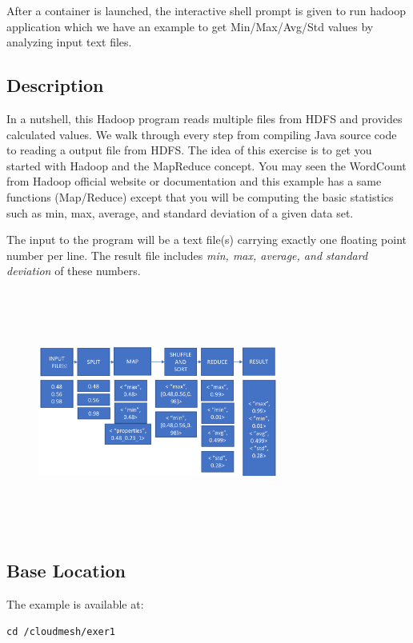 After a container is launched, the interactive shell prompt is given
to run hadoop application which we have an example to get
Min/Max/Avg/Std values by analyzing input text files.

\subsection{Description}

In a nutshell, this Hadoop program reads multiple files from HDFS and
provides calculated values. We walk through every step from compiling
Java source code to reading a output file from HDFS\@. The idea of this
exercise is to get you started with Hadoop and the MapReduce
concept. You may seen the WordCount from Hadoop official website or
documentation and this example has a same functions (Map/Reduce)
except that you will be computing the basic statistics such as min,
max, average, and standard deviation of a given data set.

The input to the program will be a text file(s) carrying exactly one
floating point number per line. The result file includes \textit{min,
  max, average, and standard deviation} of these numbers.


  \begin{figure}[!htbp]
    \includegraphics[width=8cm,height=8cm]{section/container/images/docker-hadoop-1.png}
    \centering
  \end{figure}

\subsection{Base Location}

The example is available at:

\begin{lstlisting}
cd /cloudmesh/exer1
\end{lstlisting}

